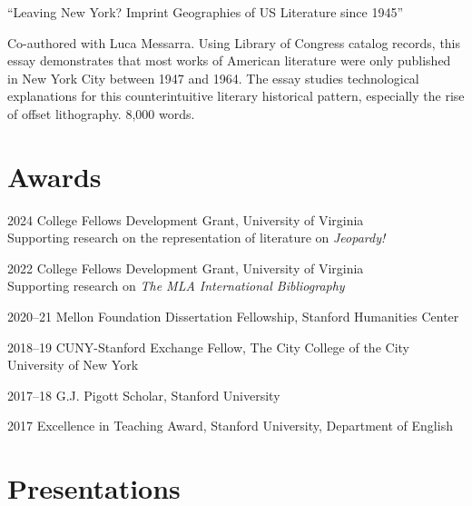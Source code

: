 \documentclass[12pt,letterpaper]{report}
\begin{document}
\bigskip

\enquote{Leaving New York? Imprint Geographies of US Literature since 1945}

\smallskip

\tabto{2em} Co-authored with Luca Messarra. Using Library of Congress catalog records, this essay demonstrates that most works of American literature were only published in New York City between 1947 and 1964. The essay studies technological explanations for this counterintuitive literary historical pattern, especially the rise of offset lithography. 8,000 words.

\section*{Awards}

\begin{tablist}
	\item[2024] \tab{}College Fellows Development Grant, University of Virginia \\
	Supporting research on the representation of literature on \textit{Jeopardy!}
	\item[2022] \tab{}College Fellows Development Grant, University of Virginia \\
	Supporting research on \textit{The MLA International Bibliography}
	\item[2020--21] \tab{}Mellon Foundation Dissertation Fellowship, Stanford Humanities Center
	\item[2018--19] \tab{}CUNY-Stanford Exchange Fellow, The City College of the City University of New York
	\item[2017--18] \tab{}G.J. Pigott Scholar, Stanford University
	\item[2017] \tab{}Excellence in Teaching Award, Stanford University, Department of English
\end{tablist}


\section*{Presentations}
\end{document}
